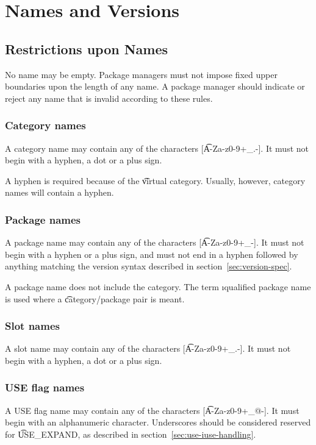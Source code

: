 \chapter{Names and Versions}

\section{Restrictions upon Names}

No name may be empty. Package managers must not impose fixed upper boundaries upon the length of any
name. A package manager should indicate or reject any name that is invalid according to these rules.

\subsection{Category names}
A category name may contain any of the characters [\t{A-Za-z0-9+_.-}]. It must not begin with
a hyphen, a dot or a plus sign.

\note A hyphen is  required because of the \t{virtual} category. Usually, however, category
names will contain a hyphen.

\subsection{Package names}
\label{sec:package-names}
A package name may contain any of the characters [\t{A-Za-z0-9+_-}]. It must not begin with a
hyphen or a plus sign, and must not end in a hyphen followed by anything matching the version
syntax described in section~\ref{sec:version-spec}.

\note A package name does not include the category. The term \i{qualified package name} is used
where a \t{category/package} pair is meant.

\subsection{Slot names}
\label{sec:slot-names}
A slot name may contain any of the characters [\t{A-Za-z0-9+_.-}]. It must not begin with a
hyphen, a dot or a plus sign.

\subsection{USE flag names}
A USE flag name may contain any of the characters [\t{A-Za-z0-9+_@-}]. It must begin with an
alphanumeric character. Underscores should be considered reserved for \t{USE_EXPAND}, as
described in section~\ref{sec:use-iuse-handling}.

